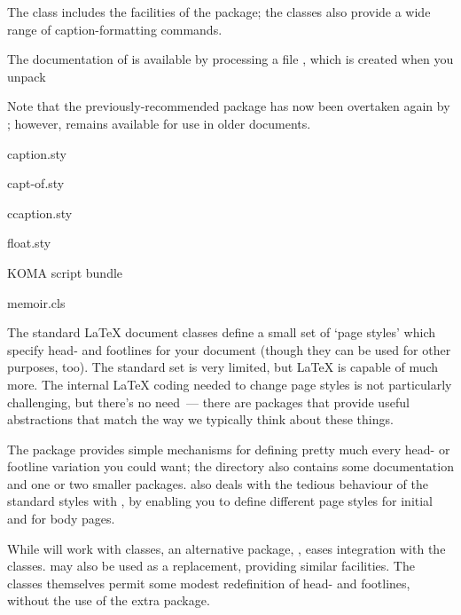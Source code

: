 The  class includes the facilities of the
 package; the  classes also
provide a wide range of caption-formatting commands.

The documentation of  is available by processing a
file , which is created when you unpack

Note that the previously-recommended package  has
now been overtaken again by ; however,
 remains available for use in older documents.
\begin{ctanrefs}
\item[caption.sty]
\item[capt-of.sty]
\item[ccaption.sty]
\item[float.sty]
\item[\nothtml{\rmfamily}KOMA script bundle]
\item[memoir.cls]
\end{ctanrefs}


The standard \LaTeX{} document classes define a small set of `page
styles' which specify head- and footlines for your document (though
they can be used for other purposes, too).  The standard set is very
limited, but \LaTeX{} is capable of much more.  The internal
\LaTeX{} coding needed to change page styles is not particularly
challenging, but there's no need~--- there are packages that provide
useful abstractions that match the way we typically think about these
things.

The  package provides
simple mechanisms for defining pretty much every head- or footline
variation you could want; the directory also contains some
documentation and one or two smaller packages.   
also deals with the tedious behaviour of the standard styles with
, by enabling you to define
different page styles for initial and for body pages.

While  will work with  classes,
an alternative package, , eases integration with the
classes.   may also be used as a 
replacement, providing similar facilities.  The 
classes themselves permit some modest redefinition of head- and
footlines, without the use of the extra package.

